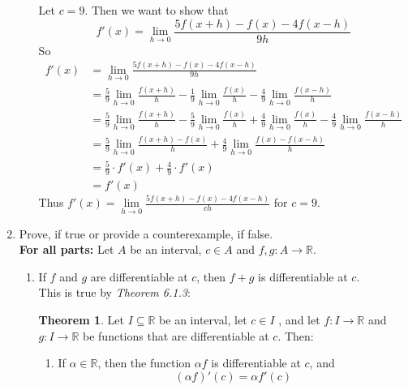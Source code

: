 \documentclass[12pt,letterpaper]{article}
\newcommand{\R}{\mathbb{R}}
\theoremstyle{case}
\theoremstyle{definition}
\newtheorem{theorem*}{Theorem}
\begin{document}
\begin{enumerate}
\begin{enumerate}
			Let $c=9$. Then we want to show that
			\[f'(x)=\lim\limits_{h \to 0}\frac{5f(x+h)-f(x)-4f(x-h)}{9h}\]
			So
			\begin{align*}
				f'(x)&= \lim\limits_{h \to 0}\frac{5f(x+h)-f(x)-4f(x-h)}{9h} \\
				&= \frac{5}{9} \lim\limits_{h \to 0} \frac{f(x+h)}{h} - \frac{1}{9} \lim\limits_{h \to 0} \frac{f(x)}{h} - \frac{4}{9} \lim\limits_{h \to 0} \frac{f(x-h)}{h} \\
				&= \frac{5}{9} \lim\limits_{h \to 0} \frac{f(x+h)}{h} - \frac{5}{9} \lim\limits_{h \to 0} \frac{f(x)}{h} + \frac{4}{9} \lim\limits_{h \to 0} \frac{f(x)}{h} - \frac{4}{9} \lim\limits_{h \to 0} \frac{f(x-h)}{h} \\
				&= \frac{5}{9} \lim\limits_{h \to 0} \frac{f(x+h)-f(x)}{h} + \frac{4}{9} \lim\limits_{h \to 0} \frac{f(x)-f(x-h)}{h} \\
				&= \frac{5}{9} \cdot f'(x) + \frac{4}{9} \cdot f'(x) \\
				&= f'(x)
			\end{align*}
			Thus $f'(x)=\lim\limits_{h \to 0}\frac{5f(x+h)-f(x)-4f(x-h)}{ch}$ for $c=9$.\\
		\end{enumerate}
		\item Prove, if true or provide a counterexample, if false.\\
		\textbf{For all parts:} Let $A$ be an interval, $c \in A$ and $f,g:A \to \R$.
		\begin{enumerate}
			\item If $f$ and $g$ are differentiable at $c$, then $f+g$ is differentiable at $c$.\\
			
			This is true by \textit{Theorem 6.1.3}:
			\begin{theorem*}
				Let $I \subseteq \R$ be an interval, let $c \in I$ , and let $f:I \rightarrow \R$ and $g:I \rightarrow \R$ be functions that are differentiable at $c$. Then:
				\begin{enumerate}
					\item If $\alpha \in \R$, then the function $\alpha f$ is differentiable at $c$, and \[(\alpha f)'(c) = \alpha f'(c)\]
					

\end{enumerate}
\end{theorem*}
\end{enumerate}
\end{enumerate}
\end{document}
